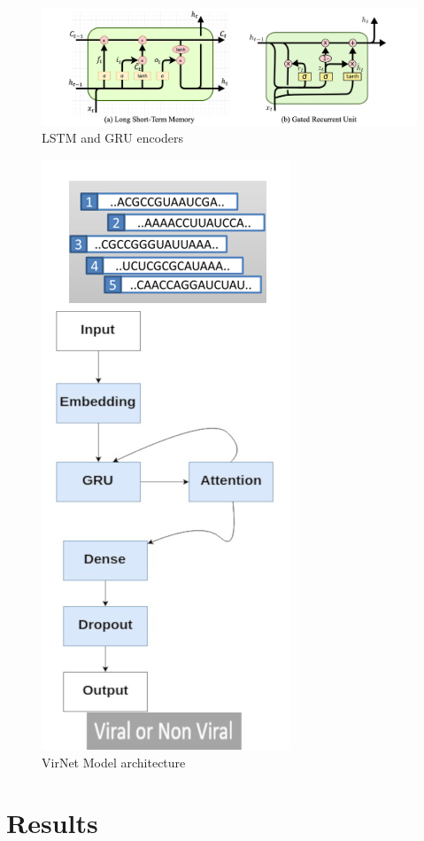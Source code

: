 \documentclass[conference]{IEEEtran}
\begin{document}
\begin{figure}
	\centering
	\includegraphics[width=1\columnwidth]{imgs/lstm_and_gru.PNG}
	\caption{LSTM and GRU encoders}
	\label{fig:lstm_gru}
\end{figure}

\begin{figure}
	\centering
	\includegraphics[width=0.5\columnwidth]{imgs/model_diagram.PNG}
	\caption{VirNet Model architecture}
	\label{fig:model_diagram}
\end{figure}


\section{Results}
\end{document}
